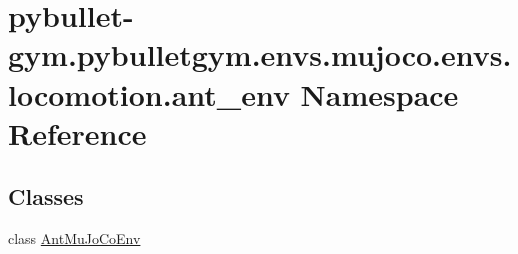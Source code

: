 \hypertarget{namespacepybullet-gym_1_1pybulletgym_1_1envs_1_1mujoco_1_1envs_1_1locomotion_1_1ant__env}{}\section{pybullet-\/gym.pybulletgym.\+envs.\+mujoco.\+envs.\+locomotion.\+ant\+\_\+env Namespace Reference}
\label{namespacepybullet-gym_1_1pybulletgym_1_1envs_1_1mujoco_1_1envs_1_1locomotion_1_1ant__env}
\subsection*{Classes}
\begin{DoxyCompactItemize}
\item 
class \hyperlink{classpybullet-gym_1_1pybulletgym_1_1envs_1_1mujoco_1_1envs_1_1locomotion_1_1ant__env_1_1_ant_mu_jo_co_env}{Ant\+Mu\+Jo\+Co\+Env}
\end{DoxyCompactItemize}
